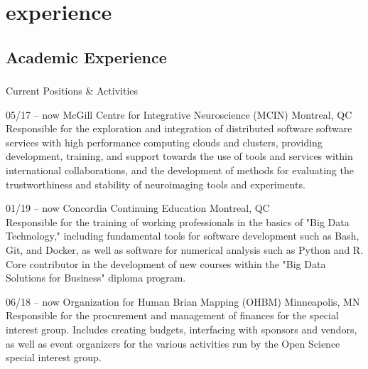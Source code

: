 \documentclass[]{friggeri-cv} %
\begin{document}
\section{experience}

\subsection{Academic Experience}

\subsubsection{}{Current Positions \& Activities}

\begin{entrylist}
\entry
{05/17 -- now}
{McGill Centre for Integrative Neuroscience (MCIN)}
{Montreal, QC}
{ \\
Responsible for the exploration and integration of distributed software software services with high
performance computing clouds and clusters, providing development, training, and support towards the
use of tools and services within international collaborations, and the development of methods for
evaluating the trustworthiness and stability of neuroimaging tools and experiments.}

\entry
{01/19 -- now}
{Concordia Continuing Education}
{Montreal, QC}
{ \\
Responsible for the training of working professionals in the basics of "Big Data Technology," including
fundamental tools for software development such as Bash, Git, and Docker, as well as software for
numerical analysis such as Python and R. Core contributor in the development of new courses within the
"Big Data Solutions for Business" diploma program.}
\end{entrylist}



\begin{entrylist}
\entry
{06/18 -- now}
{Organization for Human Brian Mapping (OHBM)}
{Minneapolis, MN}
{ \\
Responsible for the procurement and management of finances for the special interest group. Includes
creating budgets, interfacing with sponsors and vendors, as well as event organizers for the various
activities run by the Open Science special interest group.}
\end{entrylist}
\end{document}
